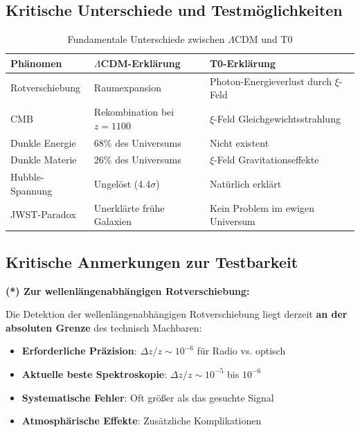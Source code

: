 \subsection{Kritische Unterschiede und Testmöglichkeiten}
\label{subsec:critical_differences}

\begin{table}[h]
	\centering
	\begin{tabular}{p{4cm}p{5cm}p{5cm}}
		\toprule
		\textbf{Phänomen} & \textbf{$\Lambda$CDM-Erklärung} & \textbf{T0-Erklärung} \\
		\midrule
		Rotverschiebung & Raumexpansion & Photon-Energieverlust durch $\xi$-Feld \\
		CMB & Rekombination bei $z=1100$ & $\xi$-Feld Gleichgewichtsstrahlung \\
		Dunkle Energie & 68\% des Universums & Nicht existent \\
		Dunkle Materie & 26\% des Universums & $\xi$-Feld Gravitationseffekte \\
		Hubble-Spannung & Ungelöst (4.4$\sigma$) & Natürlich erklärt \\
		JWST-Paradox & Unerklärte frühe Galaxien & Kein Problem im ewigen Universum \\
		\bottomrule
	\end{tabular}
	\caption{Fundamentale Unterschiede zwischen $\Lambda$CDM und T0}
\end{table}

\subsection{Kritische Anmerkungen zur Testbarkeit}
\label{subsec:testability_notes}

\textbf{(*) Zur wellenlängenabhängigen Rotverschiebung:}

Die Detektion der wellenlängenabhängigen Rotverschiebung liegt derzeit \textbf{an der absoluten Grenze} des technisch Machbaren:

\begin{itemize}
	\item \textbf{Erforderliche Präzision}: $\Delta z/z \sim 10^{-6}$ für Radio vs. optisch
	\item \textbf{Aktuelle beste Spektroskopie}: $\Delta z/z \sim 10^{-5}$ bis $10^{-6}$
	\item \textbf{Systematische Fehler}: Oft größer als das gesuchte Signal
	\item \textbf{Atmosphärische Effekte}: Zusätzliche Komplikationen
\end{itemize}

